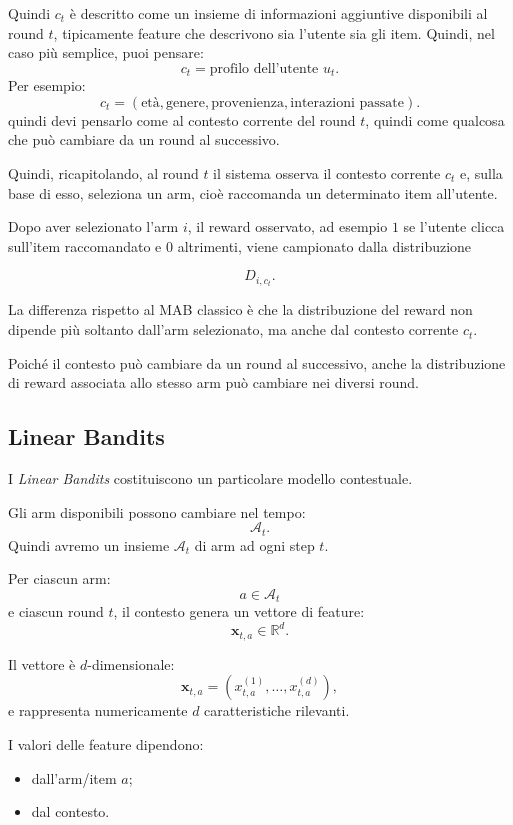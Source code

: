 Quindi $c_t$ è descritto come un insieme di informazioni aggiuntive disponibili al round \(t\), tipicamente feature che descrivono sia l'utente sia gli item.
Quindi, nel caso più semplice, puoi pensare:
\[
c_t = \text{profilo dell'utente }u_t.
\]
Per esempio:
\[
c_t =
(\text{età},\text{genere},\text{provenienza},\text{interazioni passate}).
\]
quindi devi pensarlo come al contesto corrente del round \(t\), quindi come qualcosa che può cambiare da un round al successivo.

\begin{center}
Quindi, ricapitolando, al round $t$ il sistema osserva il contesto corrente $c_t$ e, sulla base di esso, seleziona un arm, cioè raccomanda un determinato item all'utente.

Dopo aver selezionato l'arm $i$, il reward osservato, ad esempio $1$ se l'utente clicca sull'item raccomandato e $0$ altrimenti, viene campionato dalla distribuzione

\[
D_{i,c_t}.
\]

La differenza rispetto al MAB classico è che la distribuzione del reward non dipende più soltanto dall'arm selezionato, ma anche dal contesto corrente $c_t$.

Poiché il contesto può cambiare da un round al successivo, anche la distribuzione di reward associata allo stesso arm può cambiare nei diversi round.
\end{center}
\subsection{Linear Bandits}

I \emph{Linear Bandits} costituiscono un particolare modello contestuale.

Gli arm disponibili possono cambiare nel tempo:
\[
\mathcal{A}_t.
\]
Quindi avremo un insieme $\mathcal{A}_t$ di arm ad ogni step $t$.

Per ciascun arm:
\[
a\in\mathcal{A}_t
\]
e ciascun round $t$, il contesto genera un vettore di feature:
\[
\mathbf{x}_{t,a}\in\mathbb{R}^{d}.
\]

Il vettore è $d$-dimensionale:
\[
\mathbf{x}_{t,a}
=
(x_{t,a}^{(1)},\ldots,x_{t,a}^{(d)}),
\]
e rappresenta numericamente $d$ caratteristiche rilevanti.

I valori delle feature dipendono:
\begin{itemize}
    \item dall'arm/item $a$;
    \item dal contesto.
\end{itemize}

